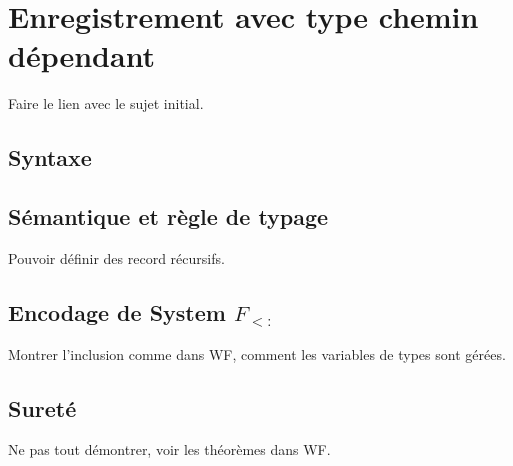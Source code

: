 \chapter{Enregistrement avec type chemin dépendant}

Faire le lien avec le sujet initial.

\section{Syntaxe}

\section{Sémantique et règle de typage}

Pouvoir définir des record récursifs.

\section{Encodage de System $F_{<:}$}

Montrer l'inclusion comme dans WF, comment les variables de types sont gérées.

\section{Sureté}

Ne pas tout démontrer, voir les théorèmes dans WF.